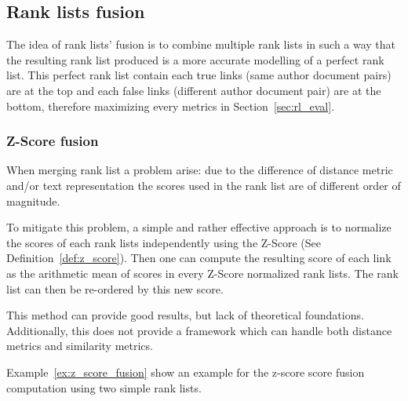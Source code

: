\subsection{Rank lists fusion}
\label{sec:rank_lists_fusion}

The idea of rank lists' fusion is to combine multiple rank lists in such a way that the resulting rank list produced is a more accurate modelling of a perfect rank list.
This perfect rank list contain each true links (same author document pairs) are at the top and each false links (different author document pair) are at the bottom, therefore maximizing every metrics in Section~\ref{sec:rl_eval}.

\subsubsection{Z-Score fusion}

When merging rank list a problem arise: due to the difference of distance metric and/or text representation the scores used in the rank list are of different order of magnitude.

To mitigate this problem, a simple and rather effective approach is to normalize the scores of each rank lists independently using the Z-Score (See Definition~\ref{def:z_score}).
Then one can compute the resulting score of each link as the arithmetic mean of scores in every Z-Score normalized rank lists.
The rank list can then be re-ordered by this new score.

This method can provide good results, but lack of theoretical foundations.
Additionally, this does not provide a framework which can handle both distance metrics and similarity metrics.

Example~\ref{ex:z_score_fusion} show an example for the z-score score fusion computation using two simple rank lists.

